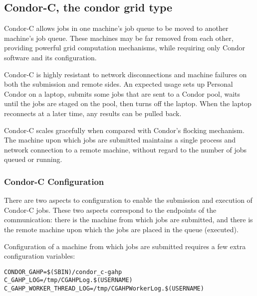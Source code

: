 
\subsection{\label{sec:Condor-C}Condor-C, the condor grid type }

Condor-C allows jobs in one machine's job queue to
be moved to another machine's job queue.
These machines may be far removed from each other,
providing powerful grid computation mechanisms,
while requiring only Condor software and its configuration.

Condor-C is highly resistant to network disconnections and machine failures on both the submission and remote sides.
An expected usage
sets up Personal Condor on a laptop,
submits some jobs that are sent to a Condor pool,
waits until the jobs are staged on the pool,
then turns off the laptop.
When the laptop reconnects at a later time,
any results can be pulled back.

Condor-C scales gracefully when compared with Condor's flocking
mechanism.
The machine upon which jobs are submitted
maintains a single process and network connection to a remote machine,
without regard to the number
of jobs queued or running.

\subsubsection{\label{sec:Condor-C-Config}Condor-C Configuration}
There are two aspects to configuration to enable the
submission and execution of Condor-C jobs.
These two aspects correspond to the endpoints of the 
communication: there is the machine from which jobs are
submitted, and there is the remote machine upon which the
jobs are placed in the queue (executed).

Configuration of a machine from which jobs are submitted
requires a few extra configuration variables:

\footnotesize
\begin{verbatim}
CONDOR_GAHP=$(SBIN)/condor_c-gahp
C_GAHP_LOG=/tmp/CGAHPLog.$(USERNAME)
C_GAHP_WORKER_THREAD_LOG=/tmp/CGAHPWorkerLog.$(USERNAME)
\end{verbatim}
\normalsize

